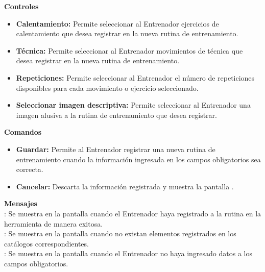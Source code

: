 \textbf{\textcolor[rgb]{0, 0, 0.545098}{Controles}}
\begin{itemize}
	\item \textbf{\textcolor[rgb]{0, 0, 0.545098}{Calentamiento:}} Permite seleccionar al Entrenador ejercicios de calentamiento que desea registrar en la nueva rutina de entrenamiento. 
	\item \textbf{\textcolor[rgb]{0, 0, 0.545098}{Técnica:}} Permite seleccionar al Entrenador movimientos de técnica que desea registrar en la nueva rutina de entrenamiento.
	\item \textbf{\textcolor[rgb]{0, 0, 0.545098}{Repeticiones:}} Permite seleccionar al Entrenador el número de repeticiones disponibles para cada movimiento o ejercicio seleccionado.
	\item \textbf{\textcolor[rgb]{0, 0, 0.545098}{Seleccionar imagen descriptiva:}} Permite seleccionar al Entrenador una imagen alusiva a la rutina de entrenamiento que desea registrar.
\end{itemize}
\vspace{1em}

\textbf{\textcolor[rgb]{0, 0, 0.545098}{Comandos}}
\begin{itemize}
	\item \textbf{\textcolor[rgb]{0, 0, 0.545098}{Guardar:}} Permite al Entrenador registrar una nueva rutina de entrenamiento cuando la información ingresada en los campos obligatorios sea correcta.
	\item \textbf{\textcolor[rgb]{0, 0, 0.545098}{Cancelar:}} Descarta la información registrada y muestra la pantalla .
\end{itemize}
\vspace{1em}

\textbf{\textcolor[rgb]{0, 0, 0.545098}{Mensajes}}\\

\textbf{}: Se muestra en la pantalla  cuando el Entrenador haya registrado a la rutina en la herramienta de manera exitosa.\\

\textbf{}: Se muestra en la pantalla  cuando no existan elementos registrados en los catálogos correspondientes.\\

\textbf{}: Se muestra en la pantalla  cuando el Entrenador no haya ingresado datos a los campos obligatorios.\\

